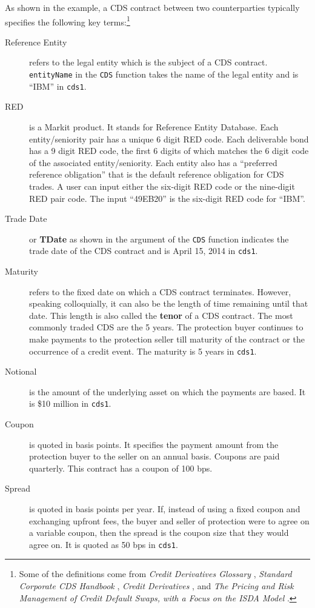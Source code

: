 \documentclass[a4paper]{article}
\begin{document}
As shown in the example, a CDS contract between two counterparties
typically specifies the following key terms:\footnote{Some of the
  definitions come from \textit{Credit Derivatives Glossary}
  \citep{glossary}, \textit{Standard Corporate CDS Handbook}
  \citep{barclays}, \textit{Credit Derivatives} \citep{bloomberg}, and
  \textit{The Pricing and Risk Management of Credit Default Swaps,
    with a Focus on the ISDA Model} \citep{openGamma}.}
\begin{description}
\item[Reference Entity] refers to the legal entity which is the
  subject of a CDS contract. \texttt{entityName} in the \texttt{CDS}
  function takes the name of the legal entity and is ``IBM'' in
  \texttt{cds1}.
\item [RED] is a Markit product. It stands for Reference Entity
  Database. Each entity/seniority pair has a unique 6 digit RED
  code. Each deliverable bond has a 9 digit RED code, the first 6
  digits of which matches the 6 digit code of the associated
  entity/seniority. Each entity also has a ``preferred reference
  obligation'' that is the default reference obligation for CDS
  trades. A user can input either the six-digit RED code or the
  nine-digit RED pair code. The input ``49EB20'' is the six-digit RED
  code for ``IBM''.
\item [Trade Date] or \textbf{TDate} as shown in the argument of the
  \texttt{CDS} function indicates the trade date of the CDS contract
  and is April 15, 2014 in \texttt{cds1}.
\item[Maturity] refers to the fixed date on which a CDS contract
  terminates. However, speaking colloquially, it can also be the
  length of time remaining until that date. This length is also called
  the \textbf{tenor} of a CDS contract. The most commonly traded CDS
  are the 5 years. The protection buyer continues to make payments to
  the protection seller till maturity of the contract or the
  occurrence of a credit event. The maturity is 5 years in
  \texttt{cds1}.
\item[Notional] is the amount of the underlying asset on which the
  payments are based. It is \$10 million in \texttt{cds1}.
\item[Coupon] is quoted in basis points. It specifies the payment
  amount from the protection buyer to the seller on an annual
  basis. Coupons are paid quarterly. This contract has a coupon of 100
  bps.
\item[Spread] is quoted in basis points per year. If, instead of using
  a fixed coupon and exchanging upfront fees, the buyer and seller of
  protection were to agree on a variable coupon, then the spread is
  the coupon size that they would agree on. It is quoted as 50 bps in
  \texttt{cds1}.
\end{description}
\end{document}
